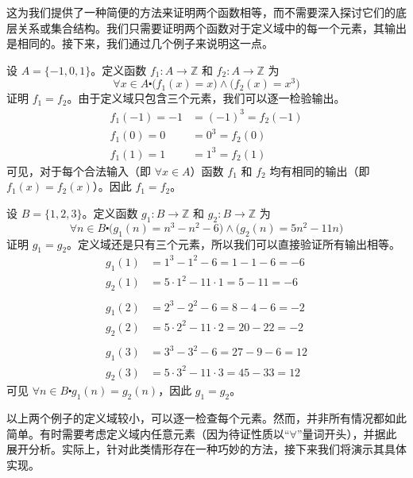 这为我们提供了一种简便的方法来证明两个函数相等，而不需要深入探讨它们的底层关系或集合结构。我们只需要证明两个函数对于定义域中的每一个元素，其输出是相同的。接下来，我们通过几个例子来说明这一点。\\

\begin{example}
    设 $A = \{-1, 0, 1\}$。定义函数 $f_1 : A \to \mathbb{Z}$ 和 $f_2 : A \to \mathbb{Z}$ 为
    \[\forall x \in A \centerdot \big(f_1(x) = x\big) \land \big(f_2(x) = x^3\big)\]
    证明 $f_1 = f_2$。由于定义域只包含三个元素，我们可以逐一检验输出。
    \begin{align*}
        f_1(-1) = -1 &= (-1)^3 = f_2(-1)\\
        f_1(0) = 0 &= 0^3 = f_2(0)\\
        f_1(1) = 1 &= 1^3 = f_2(1)
    \end{align*}
    可见，对于每个合法输入（即 $\forall x \in A$）函数 $f_1$ 和 $f_2$ 均有相同的输出（即 $f_1(x) = f_2(x)$）。因此 $f_1 = f_2$。
\end{example}

\begin{example}
    设 $B = \{1, 2, 3\}$。定义函数 $g_1 : B \to \mathbb{Z}$ 和 $g_2 : B \to \mathbb{Z}$ 为
    \[\forall n \in B \centerdot \big(g_1(n) = n^3-n^2-6\big) \land \big(g_2(n) = 5n^2-11n\big)\]
    证明 $g_1 = g_2$。定义域还是只有三个元素，所以我们可以直接验证所有输出相等。
    \begin{align*}
        g_1(1) &= 1^3 - 1^2 - 6 = 1 - 1 - 6 = -6 \\
        g_2(1) &= 5 \cdot 1^2 - 11 \cdot 1 = 5 - 11 = -6 \\
        \\
        g_1(2) &= 2^3 - 2^2 - 6 = 8 - 4 - 6 = -2 \\
        g_2(2) &= 5 \cdot 2^2 - 11 \cdot 2 = 20 - 22 = -2\\
        \\
        g_1(3) &= 3^3 - 3^2 - 6 = 27 - 9 - 6 = 12 \\
        g_2(3) &= 5 \cdot 3^2 - 11 \cdot 3 = 45 - 33 = 12
    \end{align*}
    可见 $\forall n \in B \centerdot g_1(n) = g_2(n)$，因此 $g_1 = g_2$。
\end{example}

以上两个例子的定义域较小，可以逐一检查每个元素。然而，并非所有情况都如此简单。有时需要考虑定义域内任意元素（因为待证性质以``$\forall$''量词开头），并据此展开分析。实际上，针对此类情形存在一种巧妙的方法，接下来我们将演示其具体实现。

